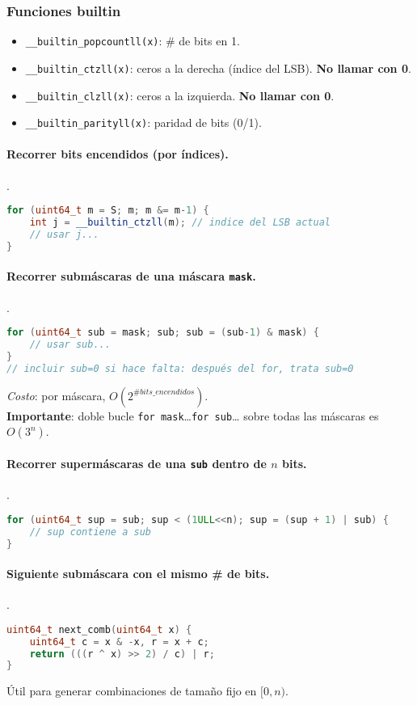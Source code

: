 \subsubsection*{Funciones builtin}
\begin{itemize}
  \item \texttt{\_\_builtin\_popcountll(x)}: \# de bits en 1.
  \item \texttt{\_\_builtin\_ctzll(x)}: ceros a la derecha (índice del LSB). \textbf{No llamar con 0}.
  \item \texttt{\_\_builtin\_clzll(x)}: ceros a la izquierda. \textbf{No llamar con 0}.
  \item \texttt{\_\_builtin\_parityll(x)}: paridad de bits (0/1).
\end{itemize}

\paragraph{Recorrer bits encendidos (por índices).} .
\begin{lstlisting}[language=C++]
for (uint64_t m = S; m; m &= m-1) {
    int j = __builtin_ctzll(m); // indice del LSB actual
    // usar j...
}
\end{lstlisting}

\paragraph{Recorrer submáscaras de una máscara \texttt{mask}.} .
\begin{lstlisting}[language=C++]
for (uint64_t sub = mask; sub; sub = (sub-1) & mask) {
    // usar sub...
}
// incluir sub=0 si hace falta: después del for, trata sub=0
\end{lstlisting}
\textit{Costo}: por máscara, $O(2^{\#bits\_encendidos})$. \\
\textbf{Importante}: doble bucle \texttt{for mask}{\ldots}\texttt{for sub}{\ldots} sobre todas las máscaras es $O(3^n)$.

\paragraph{Recorrer supermáscaras de una \texttt{sub} dentro de $n$ bits.} .
\begin{lstlisting}[language=C++]
for (uint64_t sup = sub; sup < (1ULL<<n); sup = (sup + 1) | sub) {
    // sup contiene a sub
}
\end{lstlisting}

\paragraph{Siguiente submáscara con el mismo \# de bits.} .
\begin{lstlisting}[language=C++]
uint64_t next_comb(uint64_t x) {
    uint64_t c = x & -x, r = x + c;
    return (((r ^ x) >> 2) / c) | r;
}
\end{lstlisting}
Útil para generar combinaciones de tamaño fijo en $[0,n)$.

